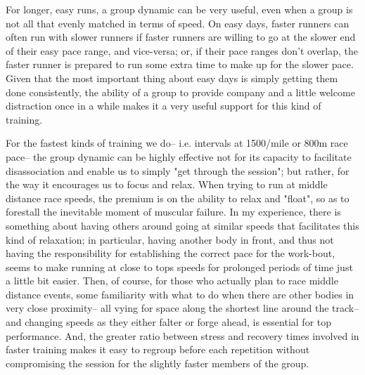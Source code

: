 For longer, easy runs, a group dynamic can be very useful, even when a group is not all that evenly matched in terms of speed. On easy days, faster runners can often run with slower runners if faster runners are willing to go at the slower end of their easy pace range, and vice-versa; or, if their pace ranges don't overlap, the faster runner is prepared to run some extra time to make up for the slower pace. Given that the most important thing about easy days is simply getting them done consistently, the ability of a group to provide company and a little welcome distraction once in a while makes it a very useful support for this kind of training.

For the fastest kinds of training we do-- i.e. intervals at 1500/mile or 800m race pace-- the group dynamic can be highly effective not for its capacity to facilitate disassociation and enable us to simply "get through the session"; but rather, for the way it encourages us to focus and relax. When trying to run at middle distance race speeds, the premium is on the ability to relax and "float", so as to forestall the inevitable moment of muscular failure. In my experience, there is something about having others around going at similar speeds that facilitates this kind of relaxation; in particular, having another body in front, and thus not having the responsibility for establishing the correct pace for the work-bout, seems to make running at close to tops speeds for prolonged periods of time just a little bit easier. Then, of course, for those who actually plan to race middle distance events, some familiarity with what to do when there are other bodies in very close proximity-- all vying for space along the shortest line around the track-- and changing speeds as they either falter or forge ahead, is essential for top performance. And, the greater ratio between stress and recovery times involved in faster training makes it easy to regroup before each repetition without compromising the session for the slightly faster members of the group.

